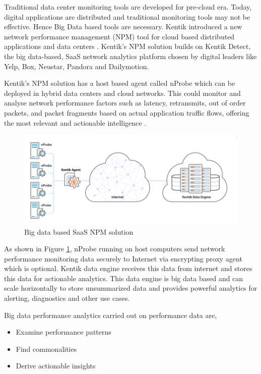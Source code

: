 \documentclass[sigconf]{acmart}
\begin{document}
Traditional data center monitoring tools are developed for pre-cloud era. Today, digital applications are distributed and traditional monitoring tools may not be effective. Hence Big Data based tools are necessary. Kentik introduced a new network performance management (NPM) tool for cloud based distributed applications and data centers \cite{kentik-introduces-new-npm-solution}. Kentik's NPM solution builds on Kentik Detect, the big data-based, SaaS network analytics platform chosen by digital leaders like Yelp, Box, Neustar, Pandora and Dailymotion.

Kentik's NPM solution has a host based agent called nProbe which can be deployed in hybrid data centers and cloud networks. This could monitor and analyse network performance factors such as latency, retransmits, out of order packets, and packet fragments based on actual application traffic flows, offering the most relevant and actionable intelligence \cite{kentik-introduces-new-npm-solution}.

\begin{figure}[htb]
  \centering
  \includegraphics[width=1.0\textwidth]{images/Figure3.png}
  \caption{Big data based SaaS NPM solution 
  \cite{big-data-network-performance-monitoring}}
  \label{fig:Figure3} 
\end{figure}

As shown in Figure \ref{fig:Figure3}, nProbe running on host computers send network performance monitoring data securely to Internet via encrypting proxy agent which is optional. Kentik data engine receives this data from internet and stores this data for actionable analytics. This data engine is big data based and can scale horizontally to store unsummarized data and provides powerful analytics for alerting, diagnostics and other use cases.

Big data performance analytics carried out on performance data are,

\begin{itemize}
\item Examine performance patterns
\item Find commonalities
\item Derive actionable insights
\end{itemize}
\end{document}
